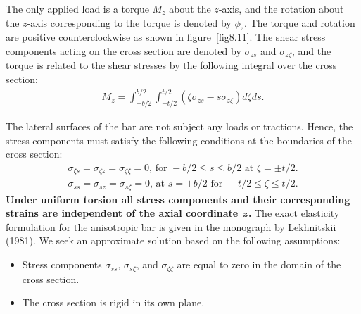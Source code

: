 \documentclass{AeroStructure-ERJohnson}
\begin{document}
\vspace*{-10pt}


\vspace*{-6pt}

The only applied load is a torque $M_{z}$ about the $z$-axis, and
the rotation about the $z$-axis corresponding to the torque is
denoted by $\phi_{z}$. The torque and rotation are positive
counterclockwise as shown in figure~\ref{fig8.11}. The shear stress
components acting on the cross section are denoted by $\sigma_{z
s}$ and $\sigma_{z \zeta}$, and the torque is related to the shear
stresses by the following integral over the cross section:
\begin{align}\label{eq8.114}
M_{z}=\int_{-b/ 2}^{b/ 2}\int_{-t/2}^{t/2}\left(\zeta
\sigma_{z s}-s \sigma_{z \zeta}\right) d \zeta d s.
\end{align}
\vspace*{2pt}
\clearpage

\noindent The lateral surfaces of the bar are not subject any loads or
tractions. Hence, the stress components must satisfy the following
conditions at the boundaries of the cross section:
\begin{gather}
\sigma_{\zeta s}=\sigma_{\zeta z}=\sigma_{\zeta \zeta}=0\mbox{, for }-b
/ 2 \leq s \leq b/ 2\mbox{ at }\zeta=\pm t/ 2. \label{eq8.115}\\
\sigma_{s s}=\sigma_{s z}=\sigma_{s \zeta}=0\mbox{, at }s=\pm b/ 2\mbox{ for }-t/ 2 \leq \zeta \leq t/ 2. \label{eq8.116}
\end{gather}
\textbf{Under uniform torsion all stress components and their
corresponding strains are independent of the axial coordinate $\textbf{\textit{z}}$.} The exact elasticity formulation for the anisotropic bar is
given in the monograph by Lekhnitskii (1981). We seek an
approximate solution based on the following assumptions:
\begin{itemize}
\item Stress components $\sigma_{s s}$, $\sigma_{s \zeta}$, and
$\sigma_{\zeta \zeta}$ are equal to zero in the domain of the
cross section.

\item The cross section is rigid in its own
plane.
\end{itemize}
\end{document}
